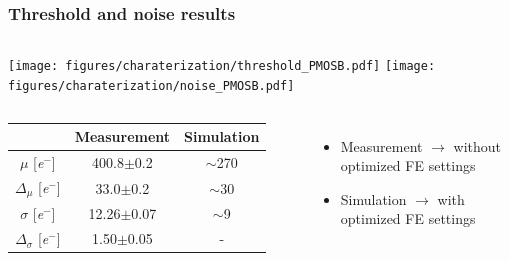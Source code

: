     \begin{frame}
        \frametitle{Threshold and noise results}
        \bigskip
        \begin{columns}
                \texttt{[image: figures/charaterization/threshold\_PMOSB.pdf]}
                \texttt{[image: figures/charaterization/noise\_PMOSB.pdf]} 
        \end{columns}                  
        \begin{columns}
                \begin{table}[h!]
                    \footnotesize
                    \begin{tabular}{| c |  c | c|}
                    \hline
                    & Measurement & Simulation \\
                    \hline
                    \hline
                    $\mu$ [\si{\elementarycharge}$^-$] & 400.8$\pm$0.2 & $\sim$270\\
                    $\Delta_{\mu}$ [\si{\elementarycharge}$^-$] & 33.0$\pm$0.2 & $\sim$30\\
                    $\sigma$ [\si{\elementarycharge}$^-$] & 12.26$\pm$0.07 & $\sim$9 \\
                    $\Delta_{\sigma}$ [\si{\elementarycharge}$^-$] & 1.50$\pm$0.05 & -\\
                    \hline
                    \end{tabular}
                \end{table}       

                \begin{itemize}
                    \item Measurement $\rightarrow$ without optimized FE settings
                    \item Simulation $\rightarrow$ with optimized FE settings
                \end{itemize}
        \end{columns}

        \end{frame}



